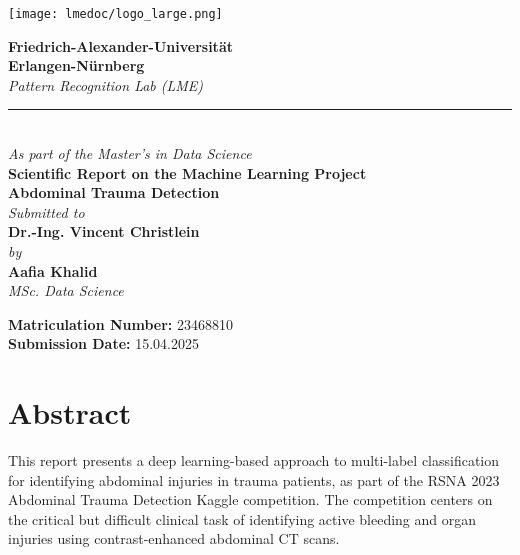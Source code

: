 \documentclass[a4paper,12pt]{article}
\begin{document}
\begin{titlepage}
    \thispagestyle{empty}
    
    \begin{center}
        \vspace*{-2.5cm}
        \texttt{[image: lmedoc/logo\_large.png]} %
        \vspace{1.8cm}

        {\LARGE \textbf{Friedrich-Alexander-Universität \\[0.3cm]Erlangen-Nürnberg}}\\[0.5cm]
        {\large \textit{Pattern Recognition Lab (LME)}}\\

        \vspace{0.5cm}
        \rule{\textwidth}{0.4pt} \\[0.5cm]
        
        {\itshape As part of the Master’s in Data Science}\\[0.4cm]
        {\Large \textbf{Scientific Report on the Machine Learning Project}}\\[1.0cm]
        {\LARGE \textbf{Abdominal Trauma Detection}}\\[0.8cm]

        {\textit{Submitted to}}\\[0.3cm]
        {\Large \textbf{Dr.-Ing. Vincent Christlein}}\\[0.4cm]

        {\textit{by}}\\[0.3cm]
        {\Large \textbf{Aafia Khalid}}\\[0.3cm]
        {\large \textit{MSc. Data Science}}\\[2.5cm]

        \begin{center}
            \large \textbf{Matriculation Number:} 23468810\\
            \large \textbf{Submission Date:} 15.04.2025
        \end{center}
    \end{center}
\end{titlepage}

\section*{Abstract}
This report presents a deep learning-based approach to multi-label classification for identifying abdominal injuries in trauma patients, as part of the RSNA 2023 Abdominal Trauma Detection Kaggle competition. The competition centers on the critical but difficult clinical task of identifying active bleeding and organ injuries using contrast-enhanced abdominal CT scans.
\end{document}
